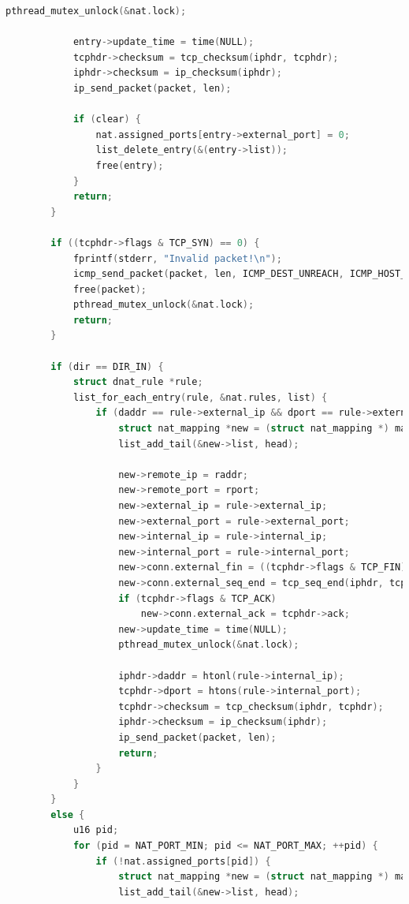 \documentclass[UTF8]{report}
\begin{document}
\begin{lstlisting}[language=C]
            pthread_mutex_unlock(&nat.lock);
    
            entry->update_time = time(NULL);
            tcphdr->checksum = tcp_checksum(iphdr, tcphdr);
            iphdr->checksum = ip_checksum(iphdr);
            ip_send_packet(packet, len);
    
            if (clear) {
                nat.assigned_ports[entry->external_port] = 0;
                list_delete_entry(&(entry->list));
                free(entry);
            }
            return;
        }
    
        if ((tcphdr->flags & TCP_SYN) == 0) {
            fprintf(stderr, "Invalid packet!\n");
            icmp_send_packet(packet, len, ICMP_DEST_UNREACH, ICMP_HOST_UNREACH);
            free(packet);
            pthread_mutex_unlock(&nat.lock);
            return;
        }
    
        if (dir == DIR_IN) {
            struct dnat_rule *rule;
            list_for_each_entry(rule, &nat.rules, list) {
                if (daddr == rule->external_ip && dport == rule->external_port) {
                    struct nat_mapping *new = (struct nat_mapping *) malloc (sizeof(struct nat_mapping));
                    list_add_tail(&new->list, head);
    
                    new->remote_ip = raddr;
                    new->remote_port = rport;
                    new->external_ip = rule->external_ip;
                    new->external_port = rule->external_port;
                    new->internal_ip = rule->internal_ip;
                    new->internal_port = rule->internal_port;
                    new->conn.external_fin = ((tcphdr->flags & TCP_FIN) != 0);
                    new->conn.external_seq_end = tcp_seq_end(iphdr, tcphdr);
                    if (tcphdr->flags & TCP_ACK)
                        new->conn.external_ack = tcphdr->ack;
                    new->update_time = time(NULL);
                    pthread_mutex_unlock(&nat.lock);
    
                    iphdr->daddr = htonl(rule->internal_ip);
                    tcphdr->dport = htons(rule->internal_port);
                    tcphdr->checksum = tcp_checksum(iphdr, tcphdr);
                    iphdr->checksum = ip_checksum(iphdr);
                    ip_send_packet(packet, len);
                    return;
                }
            }
        }
        else {
            u16 pid;
            for (pid = NAT_PORT_MIN; pid <= NAT_PORT_MAX; ++pid) {
                if (!nat.assigned_ports[pid]) {
                    struct nat_mapping *new = (struct nat_mapping *) malloc(sizeof(struct nat_mapping));
                    list_add_tail(&new->list, head);
    

\end{lstlisting}
\end{document}
